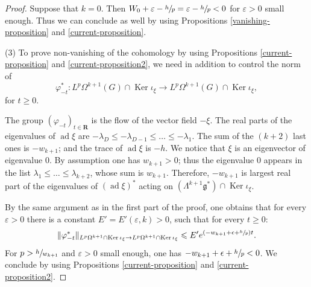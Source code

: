 \documentclass[JEP,XML,SOM,Unicode,published]{cedram}
\newcommand{\frg}{\mathfrak{g}}
\newcommand{\RR}{\mathbf{R}}
\theoremstyle{plain}
\theoremstyle{remark}
\theoremstyle{definition}
\DeclareMathOperator{\ad}{ad}
\DeclareMathOperator{\Ker}{Ker}
\begin{document}
\begin{proof}
Suppose that $k =0$. Then $W_0 + \varepsilon - \sfrac{h}{p} = \varepsilon - \sfrac{h}{p}<0 $ for $\varepsilon >0$ small enough. Thus we can conclude as well by using Propositions \ref{vanishing-proposition} and \ref{current-proposition}.

(3) To prove non-vanishing of the cohomology by using Propositions \ref{current-proposition} and \ref{current-proposition2}, we need in addition
to control the norm of
\[\varphi^*_{-t}: L^p \Omega^{k+1}(G) \cap \Ker \iota_\xi
\to L^p \Omega^{k+1}(G) \cap \Ker \iota_\xi,\]
for $t\geqslant 0$.

The group $(\varphi_{-t})_{t \in\RR}$ is the flow of the vector field $-\xi$. The real parts of the eigenvalues of $\ad\xi$ are
$-\lambda_D \leqslant -\lambda_{D-1} \leqslant \dots \leqslant -\lambda_1$. The sum of the $(k+2)$ last ones is $-w_{k+1}$; and the trace of
$\ad\xi$ is $-h$. We notice that $\xi$ is an eigenvector of eigenvalue $0$. By assumption one has $w_{k+1} >0$; thus the eigenvalue
$0$ appears in the list $\lambda_1 \leqslant \dots \leqslant \lambda_{k+2}$, whose sum is $w_{k+1}$. Therefore, $-w_{k+1}$
is largest real part of the eigenvalues of $(\ad\xi)^*$ acting on $(\Lambda^{k+1} \frg^*) \cap \Ker \iota_\xi$.

By the same argument as in the first part of the proof, one obtains that for every $\varepsilon >0$ there is a constant $E'=E'(\varepsilon, k) >0$, such that for every $t \geqslant 0$:
\[\Vert \varphi^*_{-t} \Vert_{L^p \Omega^{k+1} \cap \Ker \iota_\xi \to L^p \Omega^{k+1} \cap \Ker \iota_\xi} \leqslant E' e^{(-w_{k+1} + \epsilon +\sfrac{h}{p})t}.\]
For $p > \sfrac{h}{w_{k+1}} $ and $\varepsilon >0$ small enough, one has $-w_{k+1} + \epsilon +\sfrac{h}{p}<0$.
We conclude by using Propositions \ref{current-proposition} and \ref{current-proposition2}.
\end{proof}
\end{document}
